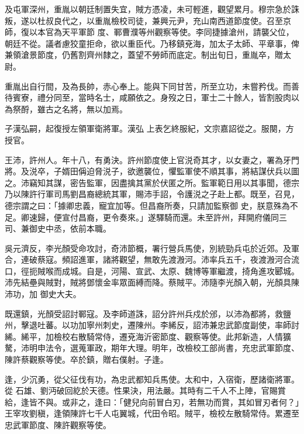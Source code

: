 \begin{pinyinscope}
 及屯軍深州，重胤以朝廷制置失宜，賊方憑凌，未可輕進，觀望累月。穆宗急於誅叛，遂以杜叔良代之，以重胤檢校司徒，兼興元尹，充山南西道節度使。召至京師，復以本官為天平軍節
 度、鄆曹濮等州觀察等使。李同捷據滄州，請襲父位，朝廷不從。議者慮狡童拒命，欲以重臣代。乃移鎮兗海，加太子太師、平章事，俾兼領滄景節度，仍舊割齊州隸之，蓋望不勞師而底定。制出旬日，重胤卒，贈太尉。



 重胤出自行間，及為長帥，赤心奉上。能與下同甘苦，所至立功，未嘗矜伐。而善待賓寮，禮分同至，當時名士，咸願依之。身歿之日，軍士二十餘人，皆割股肉以為祭酹，雖古之名將，無以加焉。



 子漢弘嗣，起復授左領軍衛將軍。漢弘
 上表乞終服紀，文宗嘉詔從之。服闋，方授官。



 王沛，許州人。年十八，有勇決。許州節度使上官涚奇其才，以女妻之，署為牙門將。及涚卒，子婿田偁迫脅涚子，欲邀襲位，懼監軍使不順其事，將結謀伏兵以圖之。沛竊知其謀，密告監軍，因盡擒其黨於伏匿之所。監軍範日用以其事聞，德宗乃以陳許行軍司馬劉昌裔總統其軍，賜沛手詔，令護涚之子赴上都。既至，召見，德宗謂之曰：「據卿忠義，寵宜加等。但昌裔所奏，只請加監察御
 史，朕意殊為不足。卿速歸，便宣付昌裔，更令奏來。」遂驛騎而還。未至許州，拜開府儀同三司、兼御史中丞，依前本職。



 吳元濟反，李光顏受命攻討，奇沛節概，署行營兵馬使，別統勁兵屯於近郊。及軍合，連破蔡寇。頻詔進軍，諸將觀望，無敢先渡溵河。沛率兵五千，夜渡溵河合流口，徑扼賊喉而成城。自是，河陽、宣武、太原、魏博等軍繼渡，掎角進攻郾城。沛先結壘與賊對，賊將鄧懷金率眾面縛而降。蔡賊平。沛隨李光顏入朝，光顏具陳沛功，加
 御史大夫。



 既還鎮，光顏受詔討鄆寇。及李師道誅，詔分許州兵戍於邠，以沛為都將，救鹽州，擊退吐蕃。以功加寧州刺史，遷陳州。李絺反，詔沛兼忠武節度副使，率師討絺。絺平，加檢校右散騎常侍，遷兗海沂密節度、觀察等使。此邦新造，人情獷驁，沛明申法令，選蒐軍政，期年大理。明年，改檢校工部尚書，充忠武軍節度、陳許蔡觀察等使。卒於鎮，贈右僕射。子逢。



 逢，少沉勇，從父征伐有功，為忠武都知兵馬使。太和中，入宿衛，歷諸衛將軍。從
 石雄、劉沔破回紇於天德。性果決，用法嚴。其時有二千人不上陣，官賜賞給，逢皆不與。或非之，逢曰：「健兒向前冒白刃，若無功而賞，其如冒刃者何？」王宰攻劉稹，逢領陳許七千人屯翼城，代田令昭。賊平，檢校左散騎常侍。累遷至忠武軍節度、陳許觀察等使。




\end{pinyinscope}
